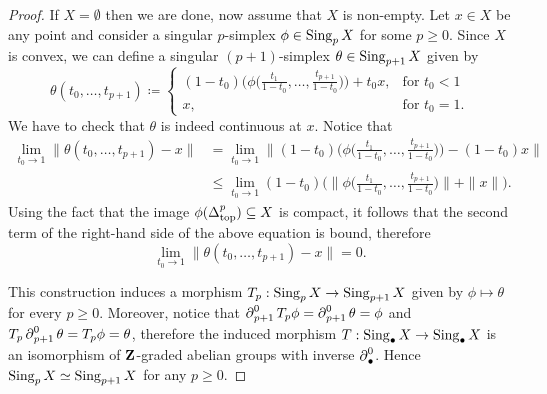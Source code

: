 \begin{proof}
    If \(X = \emptyset\) then we are done, now assume that \(X\) is non-empty. Let \(x \in X\)
    be any point and consider a singular \(p\)-simplex \(\phi \in \operatorname{Sing}_p X\) for some
    \(p \geq 0\). Since \(X\) is convex, we can define a singular \((p+1)\)-simplex \(\theta
    \in \operatorname{Sing}_{p+1} X\) given by
    \[
        \theta(t_0, \dots, t_{p+1}) \coloneq
        \begin{cases}
            (1 - t_0) \Big(\phi\Big( \frac{t_{1}}{1 - t_{0}}, \dots, \frac{t_{p+1}}{1 - t_0}
            \Big)\Big) + t_0 x, & \text{for } t_0 < 1  \\
            x,                  & \text{for } t_0 = 1.
        \end{cases}
    \]
    We have to check that \(\theta\) is indeed continuous at \(x\). Notice that
    \begin{align*}
        \lim_{t_0 \to 1} \| \theta(t_0, \dots, t_{p+1}) - x \|
         & = \lim_{t_0 \to 1} \Big\| (1 - t_0)
        \Big(\phi\Big( \frac{t_{1}}{1 - t_{0}}, \dots, \frac{t_{p+1}}{1 - t_0} \Big)\Big)
        - (1 - t_0) x
        \Big\|                                          \\
         & \leq \lim_{t_0 \to 1} (1 - t_0) \Big( \Big\|
        \phi\Big( \frac{t_{1}}{1 - t_{0}}, \dots, \frac{t_{p+1}}{1 - t_0} \Big)
        \Big\|
        + \| x \|
        \Big).
    \end{align*}
    Using the fact that the image \(\phi(\Delta_{\text{top}}^p) \subseteq X\) is compact, it follows that
    the second term of the right-hand side of the above equation is bound, therefore
    \[
        \lim_{t_0 \to 1} \| \theta(t_{0}, \dots, t_{p+1}) - x \| = 0.
    \]

    This construction induces a morphism \(T_p: \operatorname{Sing}_p X \to \operatorname{Sing}_{p+1} X\) given by
    \(\phi \mapsto \theta\) for every \(p \geq 0\). Moreover, notice that
    \(\operatorname{\partial}_{p+1}^0 T_p \phi = \operatorname{\partial}_{p+1}^0 \theta = \phi\) and
    \(T_p \operatorname{\partial}_{p+1}^0 \theta = T_p \phi = \theta\), therefore the induced morphism
    \(T: \operatorname{Sing}_{\bullet} X \to \operatorname{Sing}_{\bullet} X\) is an isomorphism of
    \(\mathbf{Z}\)-graded abelian groups with inverse \(\operatorname{\partial}_{\bullet}^0\). Hence
    \(\operatorname{Sing}_p X \simeq \operatorname{Sing}_{p + 1} X\) for any \(p \geq 0\).


\end{proof}
